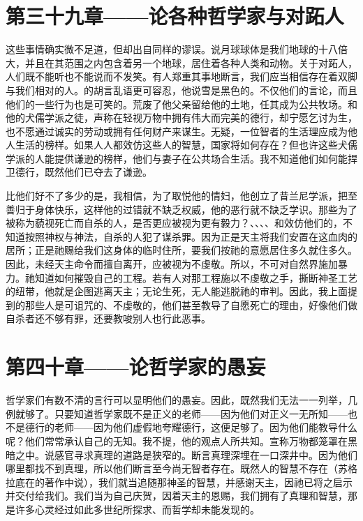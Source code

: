 
\section{第三十九章——论各种哲学家与对跖人}

这些事情确实微不足道，但却出自同样的谬误。说月球球体是我们地球的十八倍大，并且在其范围之内包含着另一个地球，居住着各种人类和动物。关于对跖人，人们既不能听也不能说而不发笑。有人郑重其事地断言，我们应当相信存在着双脚与我们相对的人。的胡言乱语更可容忍，他说雪是黑色的。不仅他们的言论，而且他们的一些行为也是可笑的。荒废了他父亲留给他的土地，任其成为公共牧场。和他的犬儒学派之徒，声称在轻视万物中拥有伟大而完美的德行，却宁愿乞讨为生，也不愿通过诚实的劳动或拥有任何财产来谋生。无疑，一位智者的生活理应成为他人生活的榜样。如果人人都效仿这些人的智慧，国家将如何存在？但也许这些犬儒学派的人能提供谦逊的榜样，他们与妻子在公共场合生活。我不知道他们如何能捍卫德行，既然他们已夺去了谦逊。\par

比他们好不了多少的是，我相信，为了取悦他的情妇，他创立了昔兰尼学派，把至善归于身体快乐，这样他的过错就不缺乏权威，他的恶行就不缺乏学识。那些为了被称为藐视死亡而自杀的人，是否更应被视为更有毅力？、、、、和效仿他们的，不知道按照神权与神法，自杀的人犯了谋杀罪。因为正是天主将我们安置在这血肉的居所；正是祂赐给我们这身体的临时住所，要我们按祂的意愿居住多久就住多久。因此，未经天主命令而擅自离开，应被视为不虔敬。所以，不可对自然界施加暴力。祂知道如何摧毁自己的工程。若有人对那工程施以不虔敬之手，撕断神圣工艺的纽带，他就是企图逃离天主；无论生死，无人能逃脱祂的审判。因此，我上面提到的那些人是可诅咒的、不虔敬的，他们甚至教导了自愿死亡的理由，好像他们做自杀者还不够有罪，还要教唆别人也行此恶事。\par


\section{第四十章——论哲学家的愚妄}

哲学家们有数不清的言行可以显明他们的愚妄。因此，既然我们无法一一列举，几例就够了。只要知道哲学家既不是正义的老师——因为他们对正义一无所知——也不是德行的老师——因为他们虚假地夸耀德行，这便足够了。因为他们能教导什么呢？他们常常承认自己的无知。我不提，他的观点人所共知。宣称万物都笼罩在黑暗之中。说感官寻求真理的道路是狭窄的。断言真理深埋在一口深井中。因为他们哪里都找不到真理，所以他们断言至今尚无智者存在。既然人的智慧不存在（苏格拉底在的著作中说），我们就当追随那神圣的智慧，并感谢天主，因祂已将之启示并交付给我们。我们当为自己庆贺，因着天主的恩赐，我们拥有了真理和智慧，那是许多心灵经过如此多世纪所探求、而哲学却未能发现的。\par


